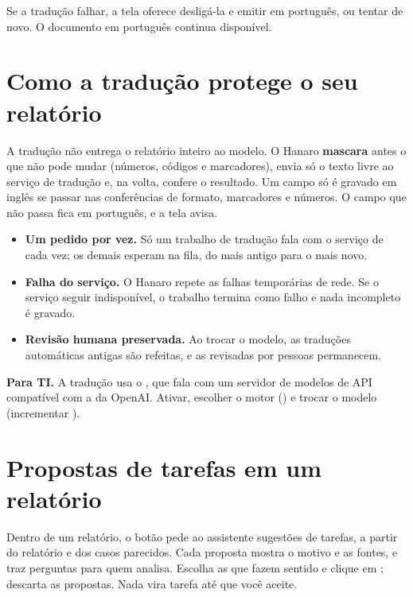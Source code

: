 \begin{remark}[dica]
Se a tradução falhar, a tela oferece desligá-la e emitir em português, ou tentar de
novo. O documento em português continua disponível.
\end{remark}

\section{Como a tradução protege o seu relatório}

A tradução não entrega o relatório inteiro ao modelo. O Hanaro \textbf{mascara} antes
o que não pode mudar (números, códigos e marcadores), envia só o texto livre ao serviço
de tradução e, na volta, confere o resultado. Um campo só é gravado em inglês se passar
nas conferências de formato, marcadores e números. O campo que não passa fica em
português, e a tela avisa.

\begin{itemize}
    \item \textbf{Um pedido por vez.} Só um trabalho de tradução fala com o serviço de
          cada vez; os demais esperam na fila, do mais antigo para o mais novo.
    \item \textbf{Falha do serviço.} O Hanaro repete as falhas temporárias de rede. Se
          o serviço seguir indisponível, o trabalho termina como falho e nada
          incompleto é gravado.
    \item \textbf{Revisão humana preservada.} Ao trocar o modelo, as traduções
          automáticas antigas são refeitas, e as revisadas por pessoas permanecem.
\end{itemize}

\begin{remark}[info]
\textbf{Para TI.} A tradução usa o , que fala com um servidor
de modelos de API compatível com a da OpenAI. Ativar, escolher o motor
() e trocar o modelo (incrementar
).
\end{remark}

\section{Propostas de tarefas em um relatório}

Dentro de um relatório, o botão  pede ao assistente sugestões de
tarefas, a partir do relatório e dos casos parecidos. Cada proposta mostra o motivo e as
fontes, e traz perguntas para quem analisa. Escolha as que fazem sentido e clique em
;  descarta as propostas. Nada vira
tarefa até que você aceite.

